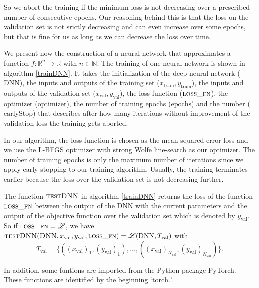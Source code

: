 So we abort the training if the minimum loss is not decreasing over a prescribed number of consecutive epochs. Our reasoning behind this is that the loss on the validation set is not srictly decreasing and can even increase over some epochs, but that is fine for us as long as we can decrease the loss over time.

We present now the construction of a neural network that approximates a function $f:\mathbb{R}^n\to\mathbb{R}$ with $n\in\mathbb{N}$. The training of one neural network is shown in algorithm \ref{trainDNN}. It takes the initialization of the deep neural network ($\mathrm{DNN}$), the inputs and outputs of the training set ($x_\mathrm{train}, y_\mathrm{train}$), the inputs and outputs of the validation set ($x_\mathrm{val}, y_\mathrm{val}$), the loss function ($\textproc{loss\_fn}$), the optimizer ($\mathrm{optimizer}$), the number of training epochs ($\mathrm{epochs}$) and the number ($\mathrm{earlyStop}$) that describes after how many iterations without improvement of the validation loss the training gets aborted.

In our algorithm, the loss function is chosen as the mean squared error loss and we use the L-BFGS optimizer with strong Wolfe line-search as our optimizer. The number of training epochs is only the maximum number of iterations since we apply early stopping to our training algorithm. Usually, the training terminates earlier because the loss over the validation set is not decreasing further.

The function $\textproc{testDNN}$ in algorithm \ref{trainDNN} returns the loss of the function $\textproc{loss\_fn}$ between the output of the DNN with the current parameters and the output of the objective function over the validation set which is denoted by $y_\mathrm{val}$. So if $\textproc{loss\_fn}=\mathscr{L}$, we have $\textproc{testDNN}(\textproc{DNN}, x_\mathrm{val}, y_\mathrm{val}, \textproc{loss\_fn}) = \mathscr{L}(\mathrm{DNN}, T_\mathrm{val})$ with
\begin{displaymath}
T_\mathrm{val}=\{((x_\mathrm{val})_1,(y_\mathrm{val})_1),\dotsc,((x_\mathrm{val})_{N_\mathrm{val}},(y_\mathrm{val})_{N_\mathrm{val}})\}.
\end{displaymath}

In addition, some funtions are imported from the Python package PyTorch. These functions are identified by the beginning `$\mathrm{torch.}$'.

